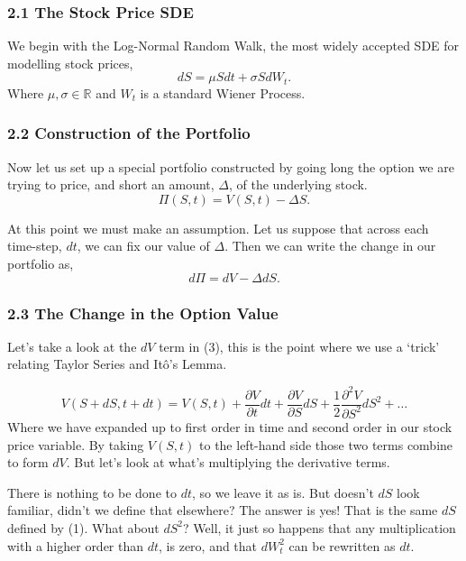 \documentclass[11pt]{article}
\begin{document}
\subsubsection*{2.1 The Stock Price SDE}
We begin with the Log-Normal Random Walk, the most widely accepted SDE for modelling stock prices,
\begin{equation}
    dS = \mu S dt + \sigma S dW_t.
\end{equation}
Where $\mu, \sigma \in \mathbb{R}$ and $W_t$ is a standard Wiener Process.

\subsubsection*{2.2 Construction of the Portfolio}
Now let us set up a special portfolio constructed by going long the option we are trying to price, and short an amount, $\Delta$, of the underlying stock. 
\begin{equation}
    \Pi(S,t) = V(S,t) - \Delta S.  
\end{equation}

At this point we must make an assumption. Let us suppose that across each time-step, $dt$, we can fix our value of $\Delta$. Then we can write the change in our portfolio as,
\begin{equation}
    d\Pi = dV - \Delta dS.
\end{equation}

\subsubsection*{2.3 The Change in the Option Value}
Let's take a look at the $dV$ term in (3), this is the point where we use a `trick' relating Taylor Series and Itô's Lemma.

\begin{equation}
    V(S+dS, t+dt) = V(S,t) + \frac{\partial V}{\partial t} dt + \frac{\partial V}{\partial S} dS + \frac{1}{2} \frac{\partial^2 V}{\partial S^2} dS^2 + \ldots
\end{equation}
Where we have expanded up to first order in time and second order in our stock price variable. By taking $V(S,t)$ to the left-hand side those two terms combine to form $dV$. But let's look at what's multiplying the derivative terms.

There is nothing to be done to $dt$, so we leave it as is. But doesn't $dS$ look familiar, didn't we define that elsewhere? The answer is yes! That is the same $dS$ defined by (1). What about $dS^2$? Well, it just so happens that any multiplication with a higher order than $dt$, is zero, and that $dW_{t}^{2}$ can be rewritten as $dt$.
\end{document}
